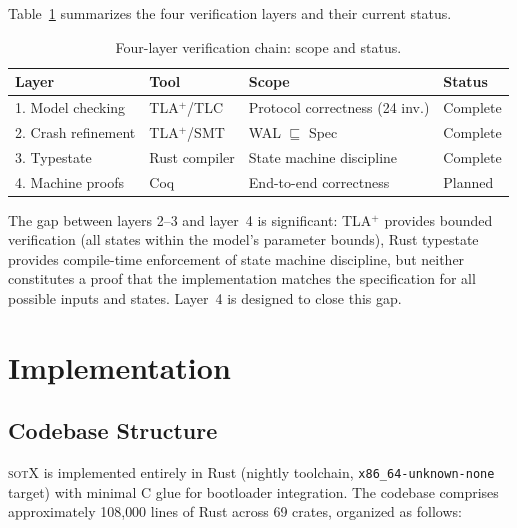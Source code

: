 \documentclass[11pt,a4paper]{article}
\theoremstyle{definition}
\theoremstyle{remark}
\newcommand{\sotx}{\textsc{sotX}}
\begin{document}
Table~\ref{tab:verif-layers} summarizes the four verification layers
and their current status.

\begin{table}[H]
\centering
\caption{Four-layer verification chain: scope and status.}
\label{tab:verif-layers}
\small
\begin{tabular}{@{}llll@{}}
\toprule
\textbf{Layer} & \textbf{Tool} & \textbf{Scope} & \textbf{Status} \\
\midrule
1. Model checking & TLA$^+$/TLC & Protocol correctness (24 inv.) & Complete \\
2. Crash refinement & TLA$^+$/SMT & WAL $\sqsubseteq$ Spec & Complete \\
3. Typestate & Rust compiler & State machine discipline & Complete \\
4. Machine proofs & Coq & End-to-end correctness & Planned \\
\bottomrule
\end{tabular}
\end{table}

The gap between layers 2--3 and layer~4 is significant: TLA$^+$
provides bounded verification (all states within the model's
parameter bounds), Rust typestate provides compile-time enforcement
of state machine discipline, but neither constitutes a proof that
the implementation matches the specification for all possible inputs
and states. Layer~4 is designed to close this gap.

\section{Implementation}
\label{sec:impl}

\subsection{Codebase Structure}
\label{sec:impl-codebase}

\sotx{} is implemented entirely in Rust (nightly toolchain,
\texttt{x86\_64-unknown-none} target) with minimal C glue for
bootloader integration. The codebase comprises approximately 108{,}000
lines of Rust across 69 crates, organized as follows:
\end{document}
